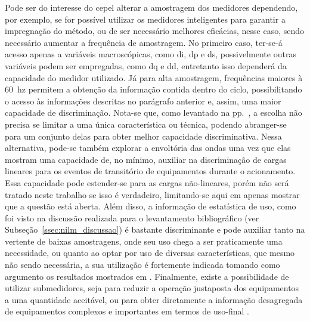 Pode ser do interesse do \acs{cepel} alterar a amostragem dos
medidores dependendo, por exemplo, se for possível utilizar os
medidores inteligentes para garantir a impregnação do método, ou de
ser necessário melhores eficácias, nesse caso, sendo necessário
aumentar a frequência de amostragem. No primeiro caso,
ter-se-á acesso apenas a variáveis macroscópicas, como \acs{di}, \acs{dp}
e \acs{ds}, possivelmente outras variáveis podem ser empregadas, como
\acs{dq} e \acs{dd}, entretanto isso dependerá da capacidade do
medidor utilizado. Já para alta amostragem, 
frequências maiores à 60~\acs{hz} permitem a obtenção da informação
contida dentro do ciclo, possibilitando o acesso às informações
descritas no parágrafo anterior e, assim, uma maior capacidade de
discriminação. Nota-se que, como levantado na
pp.~\pageref{nilm:multiplas_tecnicas}, a escolha não precisa se limitar
a uma única característica ou técnica, podendo abranger-se para um
conjunto delas para obter melhor capacidade discriminativa. Nessa
alternativa, pode-se também explorar a envoltória das ondas uma vez que
elas mostram uma capacidade de, no mínimo, auxiliar na discriminação
de cargas lineares para os eventos de transitório de equipamentos durante
o acionamento. Essa capacidade pode estender-se para as
cargas não-lineares, porém não será tratado neste trabalho se isso
é verdadeiro, limitando-se aqui em apenas mostrar que a questão
está aberta. Além disso, a informação de estatística de uso, como foi
visto na discussão realizada para o levantamento bibliográfico (ver
Subseção~\ref{ssec:nilm_discussao}) é bastante discriminante e pode
auxiliar tanto na vertente de baixas amostragens, onde seu uso chega a
ser praticamente uma necessidade, ou quanto ao optar por uso de
diversas características, que mesmo não sendo necessária, a sua
utilização é fortemente indicada tomando como argumento os resultados
mostrados em
\cite{nilm_zeifman_vast_2011,nilm_zeifman_vastext_approach_2012,
nilm_zeifman_statistical_vastext_1stws_2012,
nilm_zeifman_vast_hisample_pdfmerge_2011,
nilm_zeifman_statistical_naive_enduses_2013}. Finalmente, existe a
possibilidade de utilizar submedidores, seja para reduzir a operação
justaposta dos equipamentos a uma quantidade aceitável, ou para obter
diretamente a informação desagregada de equipamentos complexos e
importantes em termos de uso-final
\cite{seminilm_ihome_tomek_2012,seminilm_fhmm_empiricalnmeter_2013,
seminilm_berges_multisensor_2010}.



